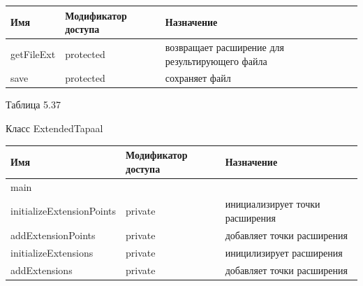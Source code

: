 \documentclass{../TechDoc}
\begin{document}
	\begin{tabular}{|p{5cm}|p{5cm}|p{5cm}|}
		\hline
		\textbf{Имя} & \textbf{Модификатор доступа} & \textbf{Назначение} \\
		\hline
		getFileExt& protected& возвращает расширение для результирующего файла\\
		\hline
		save& protected& сохраняет файл\\
		\hline
	\end{tabular}
	\begin{flushright}
		Таблица 5.37
	\end{flushright}
	Класс ExtendedTapaal
	
	\begin{tabular}{|p{5cm}|p{5cm}|p{5cm}|}
		\hline
		\textbf{Имя} & \textbf{Модификатор доступа} & \textbf{Назначение} \\
		\hline
		main& & \\
		\hline
		initializeExtensionPoints& private & инициализирует точки расширения \\
		\hline
		addExtensionPoints& private& добавляет точки расширения\\
		\hline
		initializeExtensions& private& иницилизирует расширения\\
		\hline
		addExtensions& private& добавляет точки расширения\\
		
		\hline
	\end{tabular}
	
	\registrationList
	 
	 
\end{document}
